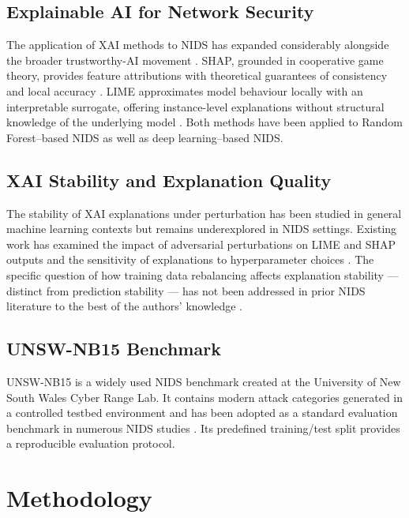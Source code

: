 \documentclass[conference,a4paper]{IEEEtran}
\newcommand{\NIDS}{NIDS\xspace}
\newcommand{\XAI}{XAI\xspace}
\begin{document}
\subsection{Explainable AI for Network Security}

The application of \XAI methods to \NIDS has expanded considerably alongside the
broader trustworthy-AI movement \cite{charmet2022,rjoub2023}. SHAP, grounded
in cooperative game theory, provides feature attributions with theoretical
guarantees of consistency and local accuracy \cite{lundberg2017,lundberg2020}.
LIME approximates model behaviour locally with an interpretable surrogate, offering
instance-level explanations without structural knowledge of the underlying
model \cite{ribeiro2016}. Both methods have been applied to Random Forest--based
\NIDS \cite{hermosilla2025a,hermosilla2025b} as well as deep learning--based
\NIDS \cite{gaspar2024}.

\subsection{XAI Stability and Explanation Quality}

The stability of \XAI explanations under perturbation has been studied in general
machine learning contexts \cite{visani2022} but remains underexplored in \NIDS
settings. Existing work has examined the impact of adversarial perturbations on
LIME and SHAP outputs \cite{charmet2022} and the sensitivity of explanations to
hyperparameter choices \cite{visani2022}. The specific question of how training
data rebalancing affects explanation stability --- distinct from prediction
stability --- has not been addressed in prior \NIDS literature to the best of the
authors' knowledge \cite{patil2020,alarab2022}.

\subsection{UNSW-NB15 Benchmark}

UNSW-NB15 \cite{moustafa2015} is a widely used \NIDS benchmark created at the
University of New South Wales Cyber Range Lab. It contains modern attack categories
generated in a controlled testbed environment and has been adopted as a standard
evaluation benchmark in numerous \NIDS
studies \cite{more2024,hermosilla2025a}. Its predefined training/test split provides
a reproducible evaluation protocol.

\section{Methodology}
\label{sec:method}
\end{document}
